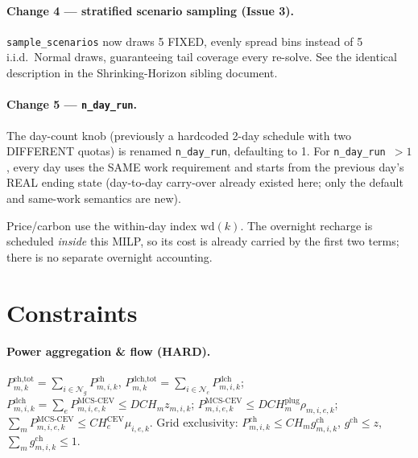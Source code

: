 \documentclass[11pt]{article}
\begin{document}
\paragraph{Change 4 --- stratified scenario sampling (Issue 3).} \texttt{sample\_scenarios} now
draws 5 FIXED, evenly spread bins instead of 5 i.i.d.\ Normal draws, guaranteeing tail coverage
every re-solve. See the identical description in the Shrinking-Horizon sibling document.

\paragraph{Change 5 --- \texttt{n\_day\_run}.} The day-count knob (previously a hardcoded 2-day
schedule with two DIFFERENT quotas) is renamed \texttt{n\_day\_run}, defaulting to 1. For
\texttt{n\_day\_run}~$>1$, every day uses the SAME work requirement and starts from the previous
day's REAL ending state (day-to-day carry-over already existed here; only the default and
same-work semantics are new).

Price/carbon use the within-day index $\mathrm{wd}(k)$. The overnight recharge is scheduled
\emph{inside} this MILP, so its cost is already carried by the first two terms; there is no
separate overnight accounting.



\section{Constraints}

\paragraph{Power aggregation \& flow (HARD).}
$P^{\text{ch,tot}}_{m,k}=\sum_{i\in\mathcal{N}_g}P^{\text{ch}}_{m,i,k}$,
$P^{\text{dch,tot}}_{m,k}=\sum_{i\in\mathcal{N}_c}P^{\text{dch}}_{m,i,k}$;
$P^{\text{dch}}_{m,i,k}=\sum_e P^{\text{MCS-CEV}}_{m,i,e,k}\le DCH_m z_{m,i,k}$;
$P^{\text{MCS-CEV}}_{m,i,e,k}\le DCH^{\text{plug}}_m\rho_{m,i,e,k}$;
$\sum_m P^{\text{MCS-CEV}}_{m,i,e,k}\le CH^{\text{CEV}}_e\mu_{i,e,k}$.
Grid exclusivity: $P^{\text{ch}}_{m,i,k}\le CH_m g^{\text{ch}}_{m,i,k}$,
$g^{\text{ch}}\le z$, $\sum_m g^{\text{ch}}_{m,i,k}\le 1$.
\end{document}
